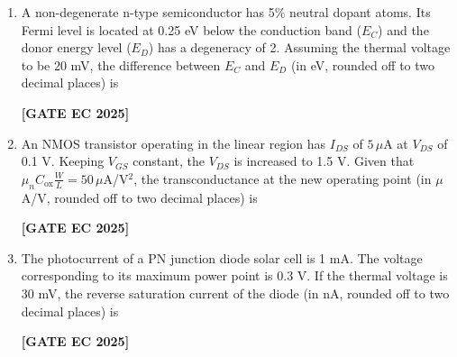 \documentclass[12pt]{article}
\begin{document}
\begin{enumerate}[leftmargin=1.5em, label=\textbf{Q.\arabic*}., itemsep=2em]
\item A non-degenerate n-type semiconductor has 5\% neutral dopant atoms. Its Fermi level is located at 0.25 eV below the conduction band ($E_C$) and the donor energy level ($E_D$) has a degeneracy of 2. Assuming the thermal voltage to be 20 mV, the difference between $E_C$ and $E_D$ (in eV, rounded off to two decimal places) is

\noindent \textbf{[GATE EC 2025]}

\item An NMOS transistor operating in the linear region has $I_{DS}$ of $5\,\mu$A at $V_{DS}$ of 0.1 V. Keeping $V_{GS}$ constant, the $V_{DS}$ is increased to 1.5 V. Given that $\mu_n C_{\text{ox}} \tfrac{W}{L} = 50\,\mu$A/V$^2$, the transconductance at the new operating point (in $\mu$A/V, rounded off to two decimal places) is

\noindent \textbf{[GATE EC 2025]}

\item The photocurrent of a PN junction diode solar cell is 1 mA. The voltage corresponding to its maximum power point is 0.3 V. If the thermal voltage is 30 mV, the reverse saturation current of the diode (in nA, rounded off to two decimal places) is

\noindent \textbf{[GATE EC 2025]}

\end{enumerate}
\end{document}
